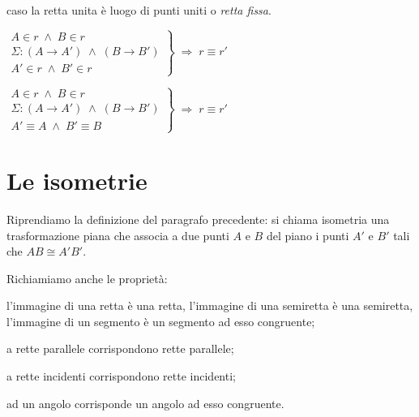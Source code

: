 caso la retta unita è luogo di punti uniti o \emph{retta fissa}.

\noindent\begin{minipage}{0.6\textwidth}\parindent15pt
\noindent $\left.\begin{array}{lll} A\in r \;\wedge\; B\in r\\ \Sigma 
: (A\rightarrow A') \;\wedge\; (B\rightarrow B')\\ A'\in r \;\wedge\; 
B'\in r \end{array}\right\} \;\Rightarrow\; r\equiv r'$
\end{minipage}\hfil
\begin{minipage}{0.4\textwidth}
	\centering
\end{minipage}\vspace{8pt}

\noindent\begin{minipage}{0.6\textwidth}\parindent15pt
\noindent $\left.\begin{array}{lll} A\in r \;\wedge\; B\in r\\ \Sigma 
: (A\rightarrow A') \;\wedge\; (B\rightarrow B')\\ A'\equiv A 
\;\wedge\; B'\equiv B \end{array}\right\} \;\Rightarrow\; r\equiv r'$
\end{minipage}\hfil
\begin{minipage}{0.4\textwidth}
	\centering
\end{minipage}


\section{Le isometrie}\label{sect:isometrie}

Riprendiamo la definizione del paragrafo precedente: si chiama 
isometria una trasformazione piana che associa a due punti $A$ e $B$ 
del piano i punti $A'$ e $B'$ tali che $AB\cong A'B'$.

Richiamiamo anche le proprietà:
\begin{itemize*}
\item l'immagine di una retta è una retta, l'immagine di una 
semiretta è una semiretta, l'immagine di un segmento è un segmento ad 
esso congruente;
\item a rette parallele corrispondono rette parallele;
\item a rette incidenti corrispondono rette incidenti;
\item ad un angolo corrisponde un angolo ad esso congruente.
\end{itemize*}


